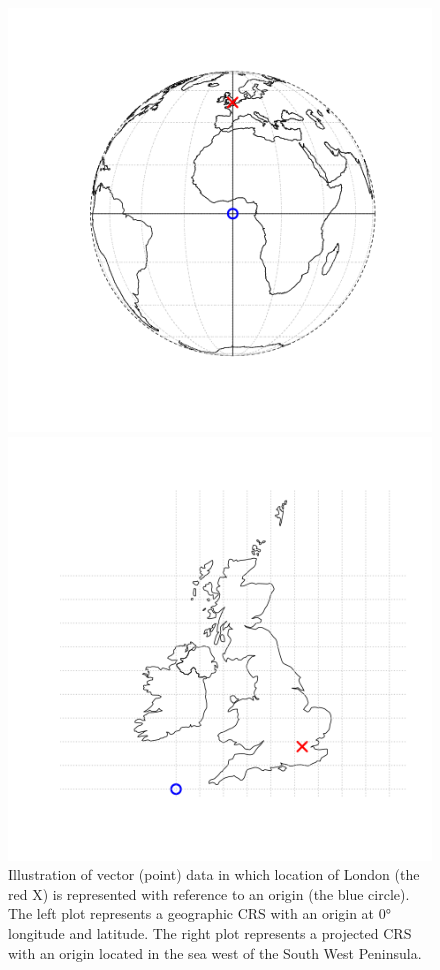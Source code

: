 \documentclass[
  letterpaper,
]{krantz}
\begin{document}
\begin{figure}

\begin{minipage}{0.50\linewidth}
\includegraphics{images/vector_lonlat.png}\end{minipage}%
%
\begin{minipage}{0.50\linewidth}
\includegraphics{images/vector_projected.png}\end{minipage}%

\caption{\label{fig-vector-london}Illustration of vector (point) data in
which location of London (the red X) is represented with reference to an
origin (the blue circle). The left plot represents a geographic CRS with
an origin at 0° longitude and latitude. The right plot represents a
projected CRS with an origin located in the sea west of the South West
Peninsula.}

\end{figure}%
\end{document}
